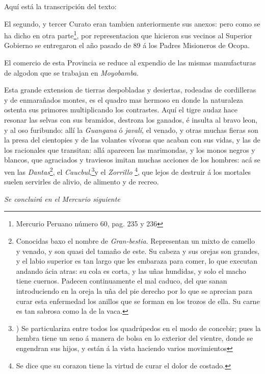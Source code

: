 \documentclass[12pt,a4paper]{article}
\begin{document}
Aquí está la transcripción del texto:

El segundo, y tercer Curato eran tambien anteriormente sus anexos: pero como se ha dicho en otra parte\footnote{Mercurio Peruano número 60, pag. 235 y 236}, por representacion que hicieron sus vecinos al Superior Gobierno se entregaron el año pasado de 89 á los Padres Misioneros de Ocopa.

El comercio de esta Provincia se reduce al expendio de las mismas manufacturas de algodon que se trabajan en \emph{Moyobamba}.

Esta grande extension de tierras despobladas y desiertas, rodeadas de cordilleras y de enmarañados montes, es el quadro mas hermoso en donde la naturaleza ostenta sus primores multiplicando los contrastes. Aquí el tigre audaz hace resonar las selvas con sus bramidos, destroza los ganados, é insulta al bravo leon, y al oso furibundo: allí la \emph{Guangana} ó \emph{javalí}, el venado, y otras muchas fieras son la presa del cientopies y de las volantes vívoras que acaban con sus vidas, y las de los racionales que transitan: allá aparecen las marimondas, y los monos negros y blancos, que agraciados y traviesos imitan muchas acciones de los hombres: acá se ven las \emph{Dantas}\footnote{Conocidas baxo el nombre de \emph{Gran-bestia}. Representan un mixto de camello y venado, y son quasi del tamaño de este. Su cabeza y sus orejas son grandes, y el labio superior es tan largo que les embaraza para comer, lo que executan andando ácia atras: su cola es corta, y las uñas hundidas, y solo el macho tiene cuernos. Padecen continuamente el mal caduco, del que sanan introduciendo en la oreja la uña del pie derecho por lo que se aprecian para curar esta enfermedad los anillos que se forman en los trozos de ella. Su carne es tan sabrosa como la de la vaca.}, el \emph{Caucbul},\footnote{) Se particulariza entre todos los quadrúpedos en el modo de concebir; pues la hembra tiene un seno á manera de bolsa en lo exterior del vientre, donde se engendran sus hijos, y están á la vista haciendo varios movimientos}y el \emph{Zorrillo} \footnote{Se dice que su corazon tiene la virtud de curar el dolor de costado.}, que lejos de destruir á los mortales suelen servirles de alivio, de alimento y de recreo.
\\

\begin{flushright}
    \emph{Se concluirá en el Mercurio siguiente}
\end{flushright}
\end{document}
